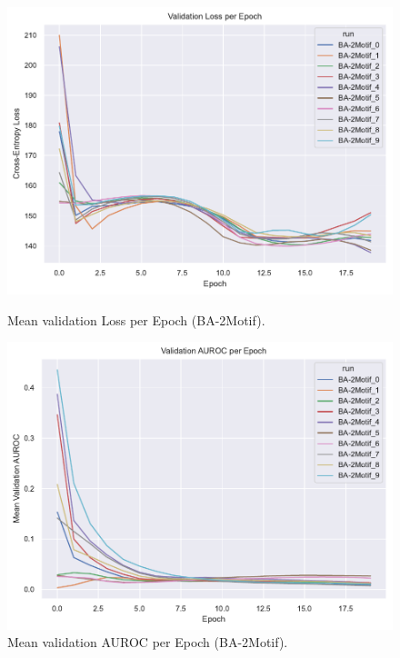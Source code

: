 \begin{figure}[htbp]
    \centering
    \begin{minipage}{0.48\textwidth}
        \centering
        \includegraphics[width=\textwidth]{img/plots/2M_val_loss_plot.pdf}  %
        \caption{Mean validation Loss per Epoch (BA-2Motif).}
        \label{fig:BA-2Motif-val_loss}
    \end{minipage}
    \hfill
    \begin{minipage}{0.48\textwidth}
        \centering
        \includegraphics[width=\textwidth]{img/plots/2M_val_auroc_plot.pdf}  %
        \caption{Mean validation AUROC per Epoch (BA-2Motif).}
        \label{fig:BA-2Motif-val_auroc}
    \end{minipage}
\end{figure}


